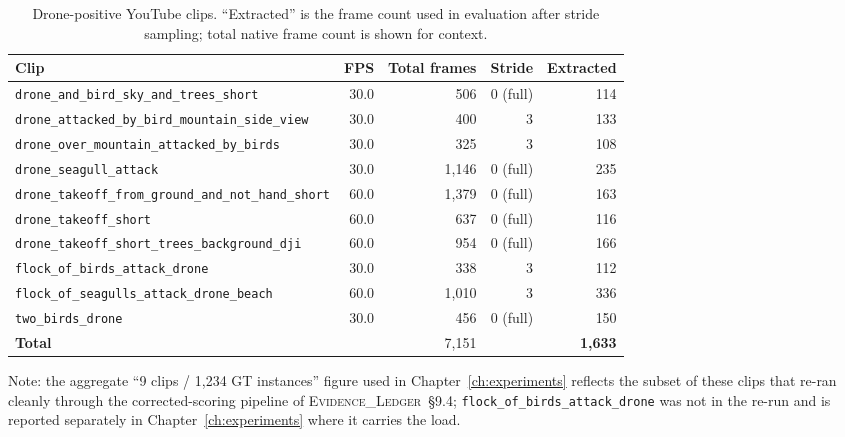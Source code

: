 \documentclass[12pt,a4paper,oneside,openright]{book}
\begin{document}
\begin{table}[htbp]
    \centering
    \caption{Drone-positive YouTube clips. ``Extracted'' is the frame count used in evaluation after stride sampling; total native frame count is shown for context.}
    \label{tab:youtube_drone_clips}
    \begin{tabular}{lrrrr}
        \toprule
        Clip & FPS & Total frames & Stride & Extracted \\
        \midrule
        \texttt{drone\_and\_bird\_sky\_and\_trees\_short}     & 30.0 &   506 & 0 (full) & 114 \\
        \texttt{drone\_attacked\_by\_bird\_mountain\_side\_view} & 30.0 & 400 & 3 & 133 \\
        \texttt{drone\_over\_mountain\_attacked\_by\_birds}   & 30.0 &   325 & 3 & 108 \\
        \texttt{drone\_seagull\_attack}                        & 30.0 & 1{,}146 & 0 (full) & 235 \\
        \texttt{drone\_takeoff\_from\_ground\_and\_not\_hand\_short} & 60.0 & 1{,}379 & 0 (full) & 163 \\
        \texttt{drone\_takeoff\_short}                         & 60.0 & 637 & 0 (full) & 116 \\
        \texttt{drone\_takeoff\_short\_trees\_background\_dji} & 60.0 & 954 & 0 (full) & 166 \\
        \texttt{flock\_of\_birds\_attack\_drone}              & 30.0 & 338 & 3 & 112 \\
        \texttt{flock\_of\_seagulls\_attack\_drone\_beach}    & 60.0 & 1{,}010 & 3 & 336 \\
        \texttt{two\_birds\_drone}                              & 30.0 & 456 & 0 (full) & 150 \\
        \midrule
        \textbf{Total} & & 7{,}151 & & \textbf{1{,}633} \\
        \bottomrule
    \end{tabular}
\end{table}

\noindent Note: the aggregate ``9 clips / 1{,}234 GT instances'' figure used in Chapter~\ref{ch:experiments} reflects the subset of these clips that re-ran cleanly through the corrected-scoring pipeline of \textsc{Evidence\_Ledger}~\S9.4; \texttt{flock\_of\_birds\_attack\_drone} was not in the re-run and is reported separately in Chapter~\ref{ch:experiments} where it carries the load.
\end{document}
